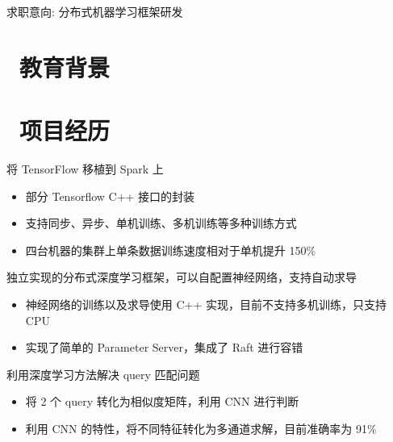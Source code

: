 \documentclass{resume}
\begin{document}

\centerline{求职意向: 分布式机器学习框架研发}



\section{\faGraduationCap\  教育背景}

\section{\faUsers\ 项目经历}
\role{Java, C++, Scala}{}
\begin{onehalfspacing}
将 TensorFlow 移植到 Spark 上
\begin{itemize}
  \item 部分 Tensorflow C++ 接口的封装
  \item 支持同步、异步、单机训练、多机训练等多种训练方式
  \item 四台机器的集群上单条数据训练速度相对于单机提升 150\%
\end{itemize}
\end{onehalfspacing}

\begin{onehalfspacing}
独立实现的分布式深度学习框架，可以自配置神经网络，支持自动求导
\begin{itemize}
  \item 神经网络的训练以及求导使用 C++ 实现，目前不支持多机训练，只支持 CPU
  \item 实现了简单的 Parameter Server，集成了 Raft 进行容错
\end{itemize}
\end{onehalfspacing}

\begin{onehalfspacing}
利用深度学习方法解决 query 匹配问题
\begin{itemize}
  \item 将 2 个 query 转化为相似度矩阵，利用 CNN 进行判断
  \item 利用 CNN 的特性，将不同特征转化为多通道求解，目前准确率为 91\%
\end{itemize}
\end{onehalfspacing}
\end{document}
